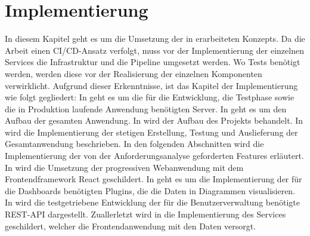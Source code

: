\chapter{Implementierung}
\label{chap:implementierung}
In diesem Kapitel geht es um die Umsetzung der in  erarbeiteten
Konzepts. Da die Arbeit einen CI/CD-Ansatz verfolgt, muss vor der Implementierung
der einzelnen Services die Infrastruktur und die Pipeline umgesetzt werden. 
Wo Tests benötigt werden, werden diese vor der Realisierung der einzelnen
Komponenten verwirklicht. Aufgrund dieser Erkenntnisse, ist das Kapitel der
Implementierung wie folgt gegliedert: In  geht es um
die für die Entwicklung, die Testphase sowie die in Produktion laufende Anwendung
benötigten Server. In  geht es um den Aufbau der gesamten
Anwendung. In  wird der Aufbau des Projekts behandelt.
In  wird die Implementierung der stetigen Erstellung, Testung und
Auslieferung der Gesamtanwendung beschrieben. In den folgenden Abschnitten wird die
Implementierung der von der Anforderungsanalyse geforderten Features erläutert.
In  wird die Umsetzung der progressiven Webanwendung
mit dem Frontendframework React geschildert. In  geht es um die
Implementierung der für die Dashboards benötigten Plugins, die die Daten
in Diagrammen visualisieren. In  wird
die testgetriebene Entwicklung der für die Benutzerverwaltung benötigte REST-API
dargestellt. Zuallerletzt wird in  die Implementierung
des Services geschildert, welcher die Frontendanwendung mit den Daten versorgt.

